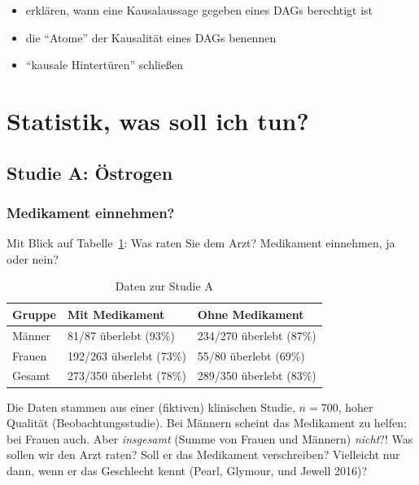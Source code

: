 \documentclass[
  a4paper,
  DIV=11]{scrreprt}
\providecommand{\tightlist}{%
  \setlength{\itemsep}{0pt}\setlength{\parskip}{0pt}}\usepackage{longtable,booktabs,array}
\theoremstyle{definition}
\theoremstyle{remark}
\begin{document}
\begin{itemize}
\tightlist
\item
  erklären, wann eine Kausalaussage gegeben eines DAGs berechtigt ist
\item
  die ``Atome'' der Kausalität eines DAGs benennen
\item
  ``kausale Hintertüren'' schließen
\end{itemize}

\hypertarget{statistik-was-soll-ich-tun}{%
\section{Statistik, was soll ich
tun?}\label{statistik-was-soll-ich-tun}}

\hypertarget{studie-a-uxf6strogen}{%
\subsection{Studie A: Östrogen}\label{studie-a-uxf6strogen}}

\hypertarget{medikament-einnehmen}{%
\subsubsection{Medikament einnehmen?}\label{medikament-einnehmen}}

Mit Blick auf Tabelle~\ref{tbl-studie-a}: Was raten Sie dem Arzt?
Medikament einnehmen, ja oder nein?

\hypertarget{tbl-studie-a}{}
\begin{longtable}{lll}
\caption{\label{tbl-studie-a}Daten zur Studie A }\tabularnewline

\toprule
Gruppe & Mit Medikament & Ohne Medikament \\ 
\midrule
Männer & 81/87 überlebt (93\%) & 234/270 überlebt (87\%) \\ 
Frauen & 192/263 überlebt (73\%) & 55/80 überlebt (69\%) \\ 
Gesamt & 273/350 überlebt (78\%) & 289/350 überlebt (83\%) \\ 
\bottomrule
\end{longtable}

Die Daten stammen aus einer (fiktiven) klinischen Studie, \(n=700\),
hoher Qualität (Beobachtungsstudie). Bei Männern scheint das Medikament
zu helfen; bei Frauen auch. Aber \emph{insgesamt} (Summe von Frauen und
Männern) \emph{nicht}?! Was sollen wir den Arzt raten? Soll er das
Medikament verschreiben? Vielleicht nur dann, wenn er das Geschlecht
kennt (Pearl, Glymour, und Jewell 2016)?
\end{document}
